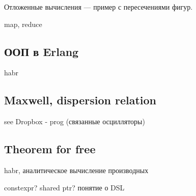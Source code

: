 \documentclass{book}
\begin{document}
\inputminted{cpp}{whyfpmatters.cpp}

Отложенные вычисления --- пример с пересечениями фигур.

map, reduce

\subsection{ООП в Erlang}

habr

\subsection{Maxwell, dispersion relation}

see Dropbox - prog (связанные осцилляторы)

\subsection{Theorem for free}

habr, аналитическое вычисление производных

constexpr?
shared ptr?
понятие о DSL



\end{document}
